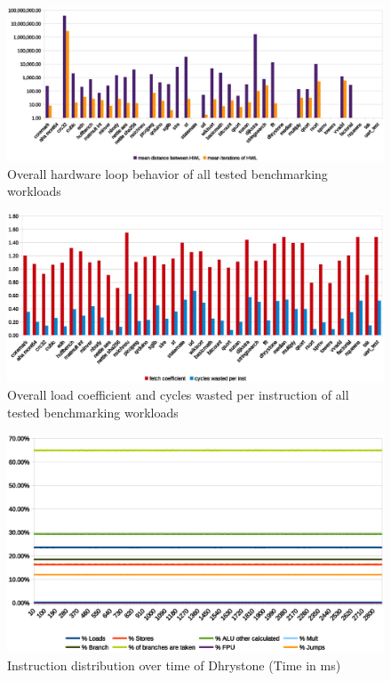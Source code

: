\documentclass[../bachelor_paper.tex]{subfiles}
\begin{document}
\begin{figure}
    \centering
    \includegraphics[width=\textwidth]{img/graph/overall_hwl.eps}
    \caption{Overall hardware loop behavior of all tested benchmarking workloads}
    \label{fig:res/overall/hwl}
\end{figure}

\begin{figure}
    \centering
    \includegraphics[width=\textwidth]{img/graph/overall_fetch_waste.eps}
    \caption{Overall load coefficient and cycles wasted per instruction of all tested benchmarking workloads}
    \label{fig:res/overall/fetch_waste}
\end{figure}

\begin{figure}
    \centering
    \includegraphics[width=\textwidth]{img/graph/riscv/dhrystone_inst.eps}
    \caption{Instruction distribution over time of Dhrystone (Time in ms)}
    \label{fig:res/dhrystone/inst}
\end{figure}
\end{document}
